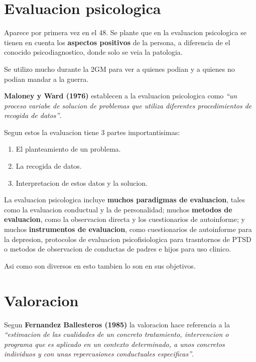 \documentclass[12pt,a4paper]{article}
\begin{document}
\section{Evaluacion psicologica}

Aparece por primera vez en el 48. Se plante que en la evaluacion psicologica se tienen en cuenta los \textbf{aspectos positivos} de la persona, a diferencia de el conocido psicodiagnostico, donde solo se veia la patologia. 

Se utilizo mucho durante la 2GM para ver a quienes podian y a quienes no podian mandar a la guerra. 

\begin{shaded}
\textbf{Maloney y Ward (1976)} establecen a la evaluacion psicologica como \textit{\enquote{un proceso variabe de solucion de problemas que utiliza diferentes procedimientos de recogida de datos}}.
\end{shaded}

Segun estos la evaluacion tiene 3 partes importantisimas:

\begin{enumerate}
	\item El planteamiento de un problema.
	\item La recogida de datos.
	\item Interpretacion de estos datos y la solucion. 
\end{enumerate}


La evaluacion psicologica incluye \textbf{muchos paradigmas de evaluacion}, tales como la evaluacion conductual y la de personalidad; muchos \textbf{metodos de evaluacion}, como la observacion directa y los cuestionarios de autoinforme; y muchos \textbf{instrumentos de evaluacion}, como cuestionarios de autoinforme para la depresion, protocolos de evaluacion psicofisiologica para trasntornos de PTSD o metodos de observacion de conductas de padres e hijos para uso clinico.

Asi como son diversos en esto tambien lo son en sus objetivos. 

\section{Valoracion}%

\begin{shaded}
	Segun \textbf{Fernandez Ballesteros (1985)} la valoracion hace referencia a la \textit{\enquote{estimacion de las cualidades de un concreto tratamiento, intervencion o programa que es aplicado en un contexto determinado, a unos concretos individuos y con unas repercusiones conductuales especificas}}.	
\end{shaded}
\end{document}
